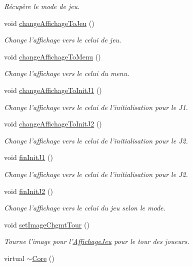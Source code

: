 \begin{DoxyCompactItemize}
\begin{DoxyCompactList}\small\item\em Récupère le mode de jeu. \end{DoxyCompactList}\item 
void \hyperlink{classCore_aa9f91b5e846906e97f1ba479ae3c1cc1}{change\+Affichage\+To\+Jeu} ()
\begin{DoxyCompactList}\small\item\em Change l'affichage vers le celui de jeu. \end{DoxyCompactList}\item 
void \hyperlink{classCore_aa6e820eee8d7479036e082652474006e}{change\+Affichage\+To\+Menu} ()
\begin{DoxyCompactList}\small\item\em Change l'affichage vers le celui du menu. \end{DoxyCompactList}\item 
void \hyperlink{classCore_a3a83d27d66ff842b74f8399c483973b1}{change\+Affichage\+To\+Init\+J1} ()
\begin{DoxyCompactList}\small\item\em Change l'affichage vers le celui de l'initialisation pour le J1. \end{DoxyCompactList}\item 
void \hyperlink{classCore_a7dde7558331088ab7d57572477fc8f2b}{change\+Affichage\+To\+Init\+J2} ()
\begin{DoxyCompactList}\small\item\em Change l'affichage vers le celui de l'initialisation pour le J2. \end{DoxyCompactList}\item 
void \hyperlink{classCore_abc88e9e2f23f9df672ffc987ea29d329}{fin\+Init\+J1} ()
\begin{DoxyCompactList}\small\item\em Change l'affichage vers le celui de l'initialisation pour le J2. \end{DoxyCompactList}\item 
void \hyperlink{classCore_af10b83849055258108b9769617edb5e5}{fin\+Init\+J2} ()
\begin{DoxyCompactList}\small\item\em Change l'affichage vers le celui du jeu selon le mode. \end{DoxyCompactList}\item 
void \hyperlink{classCore_a0a45f16dc5613ac2239f8648befb59c4}{set\+Image\+Chgmt\+Tour} ()
\begin{DoxyCompactList}\small\item\em Tourne l'image pour l'\hyperlink{classAffichageJeu}{Affichage\+Jeu} pour le tour des joueurs. \end{DoxyCompactList}\item 
\hypertarget{classCore_a776f8c46504b14183883c6273f93eaed}{virtual \hyperlink{classCore_a776f8c46504b14183883c6273f93eaed}{$\sim$\+Core} ()}\label{classCore_a776f8c46504b14183883c6273f93eaed}


\end{DoxyCompactItemize}
